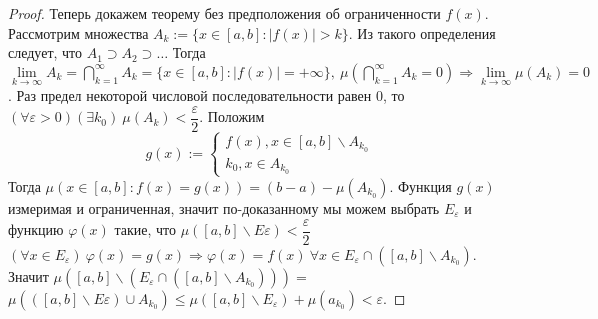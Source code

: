 \begin{proof}
Теперь докажем теорему без предположения об ограниченности $f(x)$. Рассмотрим множества $A_k:=\{x\in [a,b]: |f(x)|>k \}$. Из такого определения следует, что $A_1 \supset A_2 \supset \ldots$ Тогда $\lim\limits_{k\to\infty} A_k=\bigcap\limits_{k=1}^{\infty}A_k={\{x\in [a,b]: | f(x) | =+\infty\},}\ \mu(\bigcap\limits_{k=1}^{\infty}A_k=0) \Rightarrow \lim\limits_{k\to\infty}\mu (A_k)=0$. Раз предел некоторой числовой последовательности равен 0, то $(\forall \varepsilon >0)(\exists k_0)\ \mu (A_k)<\dfrac{\varepsilon}{2}$. Положим 
\begin{equation*}\label{key}
    g(x):=\begin{cases}
    f(x), x\in [a,b]\backslash A_{k_0}\\
    k_0, x \in A_{k_0}
    \end{cases}
\end{equation*}
Тогда $\mu (x\in [a,b]:f(x)=g(x))=(b-a)-\mu(A_{k_0})$. Функция $g(x)$ измеримая и ограниченная, значит по-доказанному мы можем выбрать $E_\varepsilon$ и функцию $\varphi(x)$ такие, что ${\mu ([a,b]\backslash E\varepsilon)<\dfrac{\varepsilon}{2} }$ $(\forall x \in E_\varepsilon)\ \varphi(x)=g(x) \Rightarrow \varphi(x) = f(x)\  \forall x \in E_\varepsilon \cap ([a,b]\backslash A_{k_0})$. Значит $\mu([a,b]\backslash(E_\varepsilon\cap([a,b]\backslash A_{k_0})))=$ $\mu(([a,b]\backslash E\varepsilon)\cup A_{k_0})\leqslant \mu([a,b]\backslash E_\varepsilon)+\mu(a_{k_0})<\varepsilon.$

\end{proof}